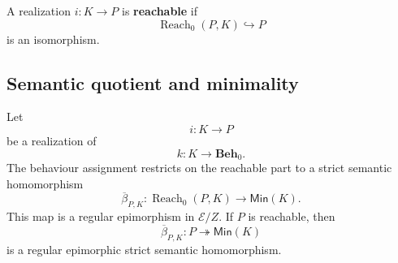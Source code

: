 \begin{definition}
\label{def:reachable-realization}
    A realization \(i:K\to P\) is \textbf{reachable} if
    \[
        \operatorname{Reach}_0(P,K)\hookrightarrow P
    \]
    is an isomorphism.
\end{definition}

\subsection{Semantic quotient and minimality}
\label{subsec:semantic-quotient-minimality}

\begin{theorem}
\label{thm:semantic-quotient-theorem}
    Let
    \[
        i:K\to P
    \]
    be a realization of
    \[
        k:K\to\mathbf{Beh}_0.
    \]
    The behaviour assignment restricts on the reachable part to a strict semantic homomorphism
    \[
        \overline{\beta}_{P,K}:
        \operatorname{Reach}_0(P,K)\to\mathsf{Min}(K).
    \]
    This map is a regular epimorphism in \(\mathcal E/Z\). If \(P\) is reachable, then
    \[
        \overline{\beta}_{P,K}:P\twoheadrightarrow\mathsf{Min}(K)
    \]
    is a regular epimorphic strict semantic homomorphism.
\end{theorem}
